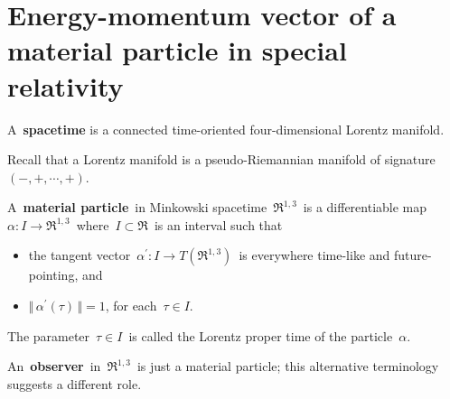 

\section{Energy-momentum vector of a material particle in special relativity}
\setcounter{theorem}{0}
\setcounter{equation}{0}


\renewcommand{\theenumi}{\roman{enumi}}
\renewcommand{\labelenumi}{\textnormal{(\theenumi)}$\;\;$}


\begin{definition}
\mbox{}
\vskip -0.01cm
\noindent
A \,\textbf{spacetime} is a
connected time-oriented four-dimensional
Lorentz manifold.
\end{definition}

\begin{remark}
\mbox{}
\vskip -0.01cm
\noindent
Recall that a Lorentz manifold is a pseudo-Riemannian manifold of signature $(-,+,\cdots,+)$.
\end{remark}


\vskip 0.5cm
\begin{definition}
\mbox{}
\vskip -0.01cm
\noindent
A \,\textbf{material particle}\, in Minkowski spacetime \,$\Re^{1,3}$\, is a differentiable map
\,$\alpha : I \longrightarrow \Re^{1,3}$\,
where \,$I \subset \Re$\, is an interval such that
\begin{itemize}
\item
	the tangent vector \,$\alpha^{\prime} : I \longrightarrow T(\Re^{1,3})$\,
	is everywhere time-like and future-pointing, and
\item
	$\Vert\,\alpha^{\prime}(\tau)\,\Vert = 1$, for each \,$\tau \in I$. 
\end{itemize}
The parameter \,$\tau \in I$\, is called the Lorentz proper time of the particle \,$\alpha$.
\end{definition}

\begin{remark}
\mbox{}
\vskip -0.01cm
\noindent
An \,\textbf{observer}\, in \,$\Re^{1,3}$\, is just a material particle;
this alternative terminology suggests a different role.
\end{remark}


